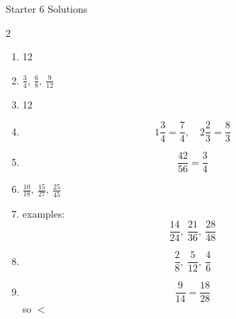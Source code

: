 \documentclass{beamer}
\begin{document}
\begin{frame}{Starter 6 Solutions}

\begin{multicols}{2}

\begin{enumerate}

\item 12

\item $\frac{3}{4},\ \frac{6}{8},\ \frac{9}{12}$

\item 12

\item 
\[
1\frac{3}{4}=\frac{7}{4},\quad
2\frac{2}{3}=\frac{8}{3}
\]

\item 
\[
\frac{42}{56}=\frac{3}{4}
\]

\columnbreak

\item $\frac{10}{18},\ \frac{15}{27},\ \frac{25}{45}$

\item examples:
\[
\frac{14}{24},\ \frac{21}{36},\ \frac{28}{48}
\]

\item 
\[
\frac{2}{8},\ \frac{5}{12},\ \frac{4}{6}
\]

\item 
\[
\frac{9}{14}=\frac{18}{28}
\]
so $<$

\end{enumerate}

\end{multicols}

\end{frame}
\end{document}
